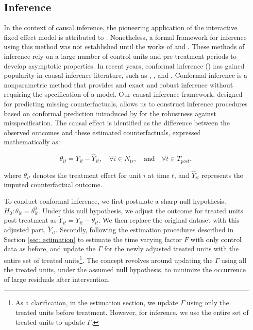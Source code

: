 \documentclass[12pt]{article}
\begin{document}
\subsection{Inference}

In the context of causal inference, the pioneering application of the interactive fixed effect model is attributed to \cite{hsiao2012panel}. Nonetheless, a formal framework for inference using this method was not established until the works of \cite{chan2016policy} and \cite{li2018inference}. These methods of inference rely on a large number of control units and pre treatment periods to develop asymptotic properties. In recent years, conformal inference (\cite{chernozhukov2021exact}) has gained popularity in causal inference literature, such as \cite{ben2021augmented}, \cite{roth2023s}, and \cite{imbens2024causal}. Conformal inference is a nonparametric method that provides and exact and robust inference without requiring the specification of a model. Our causal inference framework, designed for predicting missing counterfactuals, allows us to construct inference procedures based on conformal prediction introduced by \cite{shafer2008tutorial} for the robustness against misspecification. The causal effect is identified as the difference between the observed outcomes and these estimated counterfactuals, expressed mathematically as:

\begin{equation*}
\theta_{it} = Y_{it} - \hat{Y}_{it}, \quad \forall i \in N_{tr}, \quad \text{and} \quad \forall t \in T_{post},
\end{equation*}

\noindent where $\theta_{it}$ denotes the treatment effect for unit $i$ at time $t$, and $\hat{Y}_{it}$ represents the imputed counterfactual outcome. 
    
To conduct conformal inference, we first postulate a sharp null hypothesis, $H_0: \theta_{it} = \theta_{it}^0$. Under this null hypothesis, we adjust the outcome for treated units post treatment as $\tilde{Y}_{it} = Y_{it} - \theta_{it}$. We then replace the original dataset with this adjusted part, $\tilde{Y}_{it}$. Secondly, following the estimation procedures described in Section \ref{sec: estimation} to estimate the time varying factor $F$ with only control data as before, and update the $\Gamma$ for the newly adjusted treated units with the entire set of treated units\footnote{As a clarification, in the estimation section, we update $\Gamma$ using only the treated units before treatment. However, for inference, we use the entire set of treated units to update 
$\Gamma$.}. The concept revolves around updating the $\Gamma$ using all the treated units, under the assumed null hypothesis, to minimize the occurrence of large residuals after intervention.
\end{document}

